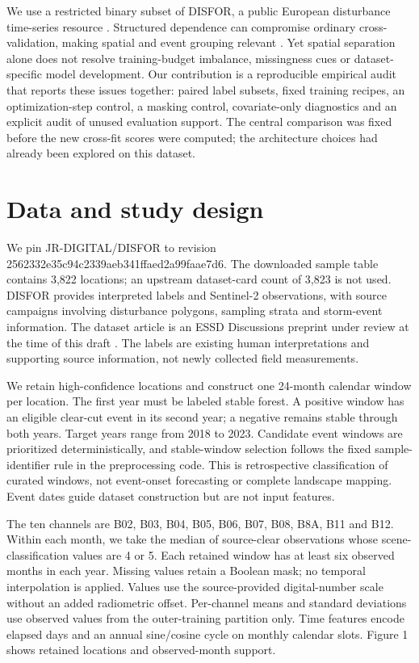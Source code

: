 \documentclass[11pt,a4paper]{article}
\begin{document}
We use a restricted binary subset of DISFOR, a public European disturbance time-series resource \cite{ref1}. Structured dependence can compromise ordinary cross-validation, making spatial and event grouping relevant \cite{ref4}. Yet spatial separation alone does not resolve training-budget imbalance, missingness cues or dataset-specific model development. Our contribution is a reproducible empirical audit that reports these issues together: paired label subsets, fixed training recipes, an optimization-step control, a masking control, covariate-only diagnostics and an explicit audit of unused evaluation support. The central comparison was fixed before the new cross-fit scores were computed; the architecture choices had already been explored on this dataset.

\section{Data and study design}
We pin JR-DIGITAL/DISFOR to revision 2562332e35c94c2339aeb341ffaed2a99faae7d6. The downloaded sample table contains 3,822 locations; an upstream dataset-card count of 3,823 is not used. DISFOR provides interpreted labels and Sentinel-2 observations, with source campaigns involving disturbance polygons, sampling strata and storm-event information. The dataset article is an ESSD Discussions preprint under review at the time of this draft \cite{ref1}. The labels are existing human interpretations and supporting source information, not newly collected field measurements.

We retain high-confidence locations and construct one 24-month calendar window per location. The first year must be labeled stable forest. A positive window has an eligible clear-cut event in its second year; a negative remains stable through both years. Target years range from 2018 to 2023. Candidate event windows are prioritized deterministically, and stable-window selection follows the fixed sample-identifier rule in the preprocessing code. This is retrospective classification of curated windows, not event-onset forecasting or complete landscape mapping. Event dates guide dataset construction but are not input features.

The ten channels are B02, B03, B04, B05, B06, B07, B08, B8A, B11 and B12. Within each month, we take the median of source-clear observations whose scene-classification values are 4 or 5. Each retained window has at least six observed months in each year. Missing values retain a Boolean mask; no temporal interpolation is applied. Values use the source-provided digital-number scale without an added radiometric offset. Per-channel means and standard deviations use observed values from the outer-training partition only. Time features encode elapsed days and an annual sine/cosine cycle on monthly calendar slots. Figure 1 shows retained locations and observed-month support.
\end{document}
